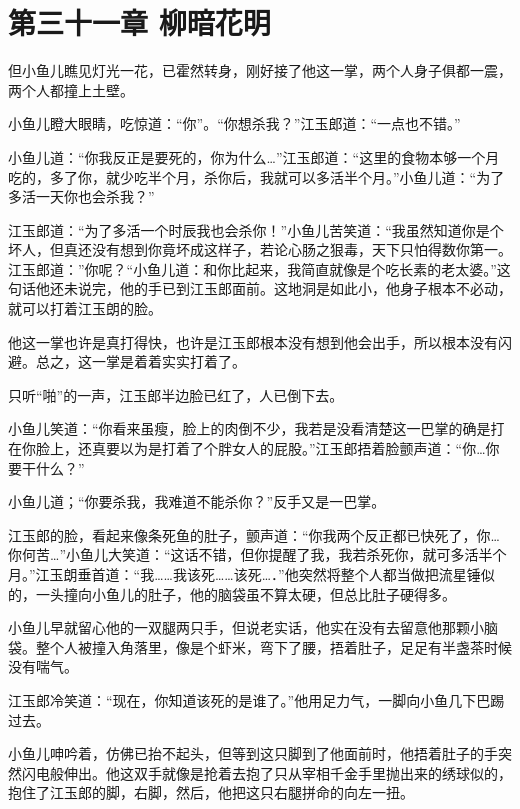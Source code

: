 \documentclass[12pt,oneside]{book}
\begin{document}
\hypertarget{ux7b2cux4e09ux5341ux4e00ux7ae0-ux67f3ux6697ux82b1ux660e}{%
\chapter{第三十一章
柳暗花明}\label{ux7b2cux4e09ux5341ux4e00ux7ae0-ux67f3ux6697ux82b1ux660e}}

但小鱼儿瞧见灯光一花，已霍然转身，刚好接了他这一掌，两个人身子俱都一震，两个人都撞上土壁。

小鱼儿瞪大眼睛，吃惊道：``你''。``你想杀我？''江玉郎道：``一点也不错。''

小鱼儿道：``你我反正是要死的，你为什么\ldots{}''江玉郎道：``这里的食物本够一个月吃的，多了你，就少吃半个月，杀你后，我就可以多活半个月。''小鱼儿道：``为了多活一天你也会杀我？''

江玉郎道：``为了多活一个时辰我也会杀你！''小鱼儿苦笑道：``我虽然知道你是个坏人，但真还没有想到你竟坏成这样子，若论心肠之狠毒，天下只怕得数你第一。江玉郎道：''你呢？``小鱼儿道：和你比起来，我简直就像是个吃长素的老太婆。''这句话他还未说完，他的手已到江玉郎面前。这地洞是如此小，他身子根本不必动，就可以打着江玉朗的脸。

他这一掌也许是真打得快，也许是江玉郎根本没有想到他会出手，所以根本没有闪避。总之，这一掌是着着实实打着了。

只听``啪''的一声，江玉郎半边脸已红了，人已倒下去。

小鱼儿笑道：``你看来虽瘦，脸上的肉倒不少，我若是没看清楚这一巴掌的确是打在你脸上，还真要以为是打着了个胖女人的屁股。''江玉郎捂着脸颤声道：``你\ldots 你要干什么？''

小鱼儿道；``你要杀我，我难道不能杀你？''反手又是一巴掌。

江玉郎的脸，看起来像条死鱼的肚子，颤声道：``你我两个反正都已快死了，你\ldots 你何苦\ldots{}''小鱼儿大笑道：``这话不错，但你提醒了我，我若杀死你，就可多活半个月。''江玉朗垂首道：``我\ldots\ldots 我该死\ldots\ldots 该死\ldots．''他突然将整个人都当做把流星锤似的，一头撞向小鱼儿的肚子，他的脑袋虽不算太硬，但总比肚子硬得多。

小鱼儿早就留心他的一双腿两只手，但说老实话，他实在没有去留意他那颗小脑袋。整个人被撞入角落里，像是个虾米，弯下了腰，捂着肚子，足足有半盏茶时候没有喘气。

江玉郎冷笑道：``现在，你知道该死的是谁了。''他用足力气，一脚向小鱼几下巴踢过去。

小鱼儿呻吟着，仿佛已抬不起头，但等到这只脚到了他面前时，他捂着肚子的手突然闪电般伸出。他这双手就像是抢着去抱了只从宰相千金手里抛出来的绣球似的，抱住了江玉郎的脚，右脚，然后，他把这只右腿拼命的向左一扭。
\end{document}
